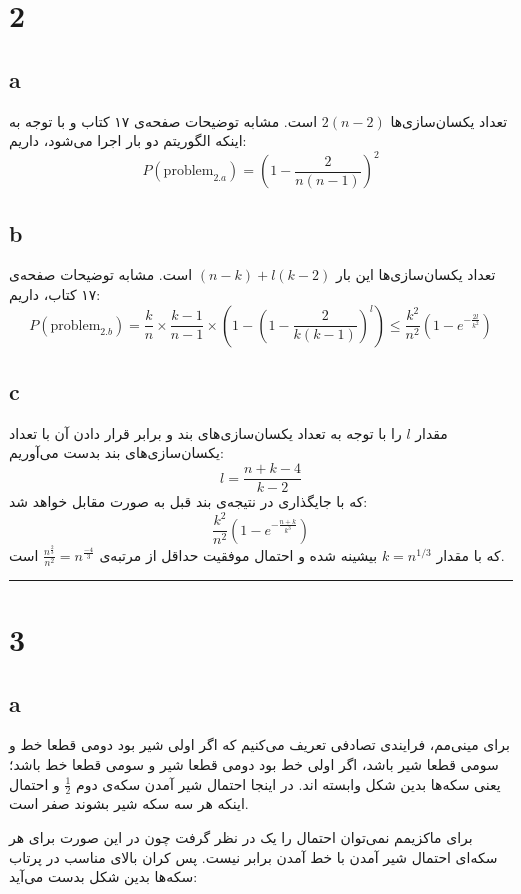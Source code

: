 \documentclass{article}
\begin{document}
\section*{2}
\subsection*{a}
تعداد یکسان‌سازی‌ها
$2(n-2)$
است. مشابه توضیحات صفحه‌ی ۱۷ کتاب و با توجه به اینکه الگوریتم دو بار اجرا می‌شود، داریم:
$$ P(\text{problem}_{2.a}) = \left(1 - \frac{2}{n(n-1)}\right)^2 $$

\subsection*{b}
تعداد یکسان‌سازی‌ها این بار
$(n-k) + l(k-2)$
است. مشابه توضیحات صفحه‌ی ۱۷ کتاب، داریم:
$$ P(\text{problem}_{2.b}) = \frac{k}{n} \times \frac{k-1}{n-1} \times \left(1 - \left(1 - \frac{2}{k(k-1)} \right)^l\right) \leq \frac{k^2}{n^2} \left(1 - e^{-\frac{2l}{k^2}}\right) $$

\subsection*{c}
مقدار
$l$
را با توجه به تعداد یکسان‌سازی‌های بند
و برابر قرار دادن آن با تعداد یکسان‌سازی‌های بند
بدست می‌آوریم:
$$ l = \frac{n+k-4}{k-2} $$
که با جایگذاری در نتیجه‌ی بند قبل به صورت مقابل خواهد شد:
$$\frac{k^2}{n^2}\left(1 - e^{-\frac{n+k}{k^3}}\right)$$
که با مقدار
$k = n^{1/3}$
بیشینه شده و احتمال موفقیت حداقل از مرتبه‌ی
$\frac{n^{\frac{2}{3}}}{n^2} = n^{\frac{-4}{3}}$
است.

\rule{\linewidth}{1pt}

\section*{3}
\subsection*{a}
برای مینی‌مم، فرایندی تصادفی تعریف می‌کنیم که اگر اولی شیر بود دومی قطعا خط و سومی قطعا شیر باشد، اگر اولی خط بود دومی قطعا شیر و سومی قطعا خط باشد؛ یعنی سکه‌ها بدین شکل وابسته اند. 
در اینجا احتمال شیر آمدن سکه‌ی دوم
$\frac{1}{2}$
و احتمال اینکه هر سه سکه شیر بشوند صفر است.

برای ماکزیمم نمی‌توان احتمال
را یک در نظر گرفت چون در این صورت برای هر سکه‌ای احتمال شیر آمدن با خط آمدن برابر نیست. پس کران بالای مناسب در پرتاب سکه‌ها بدین شکل بدست می‌آید:
\end{document}

